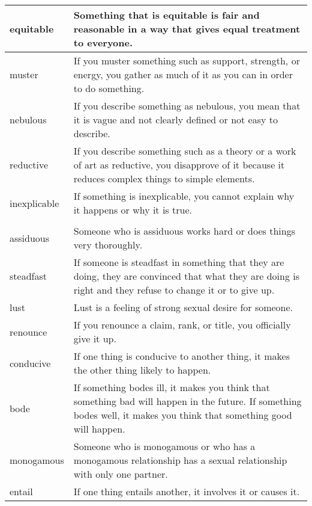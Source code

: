 \documentclass{article}
\begin{document}
\begin{center}
\begin{longtable}{|l|p{9cm}|}
\hline
equitable
&
Something that is equitable is fair and reasonable in a way that gives equal treatment to everyone.
\\

\hline
muster
&
If you muster something such as support, strength, or energy, you gather as much of it as you can in order to do something.
\\

\hline
nebulous
&
If you describe something as nebulous, you mean that it is vague and not clearly defined or not easy to describe.
\\

\hline
reductive
&
If you describe something such as a theory or a work of art as reductive, you disapprove of it because it reduces complex things to simple elements.
\\

\hline
inexplicable
&
If something is inexplicable, you cannot explain why it happens or why it is true.
\\

\\

\hline
assiduous
&
Someone who is assiduous works hard or does things very thoroughly.
\\

\hline
steadfast
&
If someone is steadfast in something that they are doing, they are convinced that what they are doing is right and they refuse to change it or to give up.
\\

\hline
lust
&
Lust is a feeling of strong sexual desire for someone.
\\

\hline
renounce
&
If you renounce a claim, rank, or title, you officially give it up.
\\

\hline
conducive
&
If one thing is conducive to another thing, it makes the other thing likely to happen.
\\

\hline
bode
&
If something bodes ill, it makes you think that something bad will happen in the future. If something bodes well, it makes you think that something good will happen.
\\

\hline
monogamous
&
Someone who is monogamous or who has a monogamous relationship has a sexual relationship with only one partner.
\\

\hline
entail
&
If one thing entails another, it involves it or causes it.
\\


\end{longtable}
\end{center}
\end{document}
